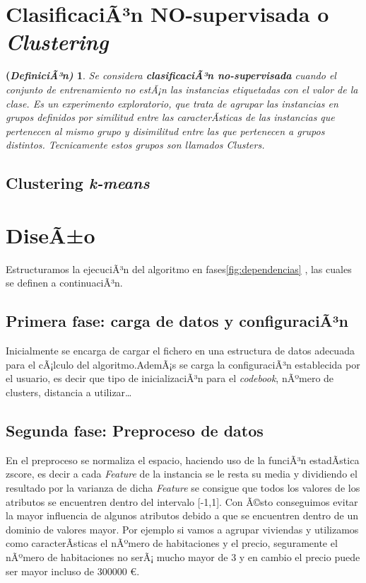 \documentclass[10pt,a4paper]{article}
\newtheorem{defi}{(\it DefiniciÃ³n)}[section]%
\begin{document}
\section{ClasificaciÃ³n \textbf{NO-supervisada} o \textit{Clustering}}

\begin{defi}
	Se considera \textbf{clasificaciÃ³n no-supervisada} cuando el conjunto de
	entrenamiento  no estÃ¡n las instancias etiquetadas con el valor de la clase. Es
	un experimento exploratorio, que trata de agrupar las instancias en grupos
	definidos por similitud entre las caracterÃ­sticas de las instancias que
	pertenecen al mismo grupo y disimilitud entre las que pertenecen a grupos
	distintos. Tecnicamente estos grupos son llamados \textit{Clusters}.
\end{defi}

\subsection{Clustering \textit{\textbf{k-means}}}


\section{DiseÃ±o}
 
 Estructuramos la ejecuciÃ³n del algoritmo en fases\ref{fig:dependencias} , las cuales se definen a continuaciÃ³n.\\
 
\subsection*{Primera fase: carga de datos y configuraciÃ³n}
 
 Inicialmente se encarga de cargar el fichero en una estructura de datos adecuada para el cÃ¡lculo del algoritmo.AdemÃ¡s se carga la configuraciÃ³n establecida
 por el usuario, es decir que tipo de inicializaciÃ³n para el \textit{codebook}, nÃºmero de clusters, distancia a utilizar\dots

\subsection*{Segunda fase: Preproceso de datos}

En el preproceso se normaliza el espacio, haciendo uso de la funciÃ³n estadÃ­stica zscore, es decir a cada \textit{Feature} de la instancia se le resta su media y dividiendo el resultado por la varianza de dicha \textit{Feature} se consigue que todos los valores de los atributos se encuentren dentro del intervalo [-1,1]. Con Ã©sto conseguimos evitar la mayor influencia de algunos atributos debido a que se encuentren dentro de un dominio de valores mayor. Por ejemplo si vamos a agrupar viviendas y utilizamos como caracterÃ­sticas el nÃºmero de habitaciones y el precio, seguramente el nÃºmero de habitaciones no serÃ¡ mucho mayor de 3 y en cambio el precio puede ser mayor incluso de 300000 \euro .\cite{coursera}
\end{document}
